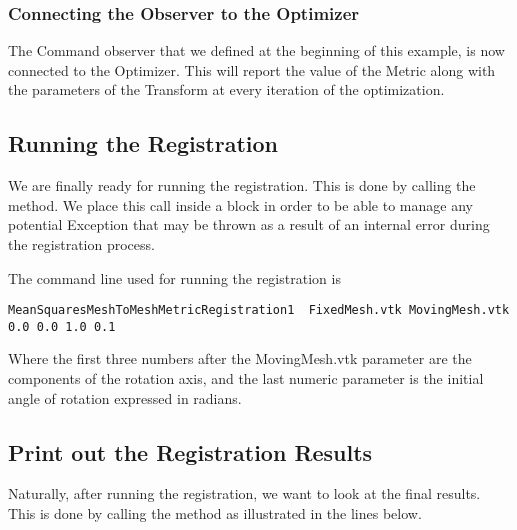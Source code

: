 \documentclass{InsightArticle}
\begin{document}
\subsubsection{Connecting the Observer to the Optimizer}

The Command observer that we defined at the beginning of this example, is now
connected to the Optimizer.  This will report the value of the Metric along
with the parameters of the Transform at every iteration of the optimization.

\begin{center}

\end{center}


\subsection{Running the Registration}

We are finally ready for running the registration. This is done by calling the
 method. We place this call inside a 
block in order to be able to manage any potential Exception that may be thrown
as a result of an internal error during the registration process.

\begin{center}

\end{center}


The command line used for running the registration is

\begin{verbatim} 
MeanSquaresMeshToMeshMetricRegistration1  FixedMesh.vtk MovingMesh.vtk 0.0 0.0 1.0 0.1
\end{verbatim} 

Where the first three numbers after the MovingMesh.vtk parameter are the
components of the rotation axis, and the last numeric parameter is the initial
angle of rotation expressed in radians.


\subsection{Print out the Registration Results}

Naturally, after running the registration, we want to look at the final
results. This is done by calling the  method
as illustrated in the lines below.
\end{document}
